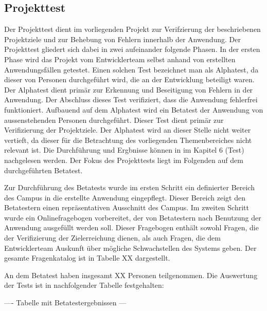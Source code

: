 \subsection{Projekttest}
\label{sec:Projekttest}

Der Projekttest dient im vorliegenden Projekt zur Verifzierung der beschriebenen
Projektziele und zur Behebung von Fehlern innerhalb der Anwendung. Der
Projekttest gliedert sich dabei in zwei aufeinander folgende Phasen. In der
ersten Phase wird das Projekt vom Entwicklerteam selbst anhand von erstellten
Anwendungsfällen getestet. Einen solchen Test bezeichnet man als Alphatest, da
dieser von Personen durchgeführt wird, die an der Entwicklung beteiligt waren.
Der Alphatest dient primär zur Erkennung und Beseitigung von Fehlern in der
Anwendung. Der Abschluss dieses Test verifiziert, dass die Anwendung fehlerfrei
funktioniert. Aufbauend auf dem Alphatest wird ein Betatest der Anwendung von
aussenstehenden Personen durchgeführt. Dieser Test dient primär zur
Verifizierung der Projektziele. Der Alphatest wird an dieser Stelle nicht weiter
vertieft, da dieser für die Betrachtung des vorliegenden Themenbereiches nicht
relevant ist. Die Durchführung und Ergbnisse können in
\citet{modelierungUndBetrieb2014} im Kapitel 6 (Test) nachgelesen werden. Der
Fokus des Projekttests liegt im Folgenden auf dem durchgeführten Betatest.

Zur Durchführung des Betatests wurde im ersten Schritt ein definierter Bereich
des Campus in die erstellte Anwendung eingepflegt. Dieser Bereich zeigt den
Betatestern einen repräsentativen Ausschnitt des Campus.
Im zweiten Schritt wurde ein Onlinefragebogen vorbereitet, der von Betatestern
nach Benutzung der Anwendung ausgefüllt werden soll. Dieser Fragebogen enthält 
sowohl Fragen, die der Verifizierung der Zielerreichung dienen, als auch
Fragen, die dem Entwicklerteam Auskunft über mögliche Schwachstellen des Systems geben.
Der gesamte Fragenkatalog ist in Tabelle XX dargestellt.

An dem Betatest haben insgesamt XX Personen teilgenommen. Die Auswertung der Tests ist in nachfolgender Tabelle
festgehalten:

---- Tabelle mit Betatestergebnissen ---